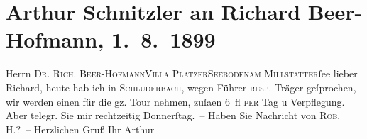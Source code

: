 

         
         \renewcommand{\erwaehntePersonen}{Personen: Richard Beer-Hofmann, Robert Hirschfeld}
         \renewcommand{\erwaehnteOrte}{Orte: Carbonin, Millstätter See, Seeboden, Toblach, Villa Platzer}
         \renewcommand{\erwaehnteWerke}{}
               \section[Arthur Schnitzler an Richard Beer-Hofmann, 1. 8. 1899]{ Arthur Schnitzler an Richard Beer-Hofmann, 1. 8. 1899}\nopagebreak{}\rehead{ }\begin{ledgroupsized}[t]{13cm}\normalsize\beginnumbering \toendnotes[C]{\smallbreak\pagebreak[2]} 
\pstart{}{\pb}Herrn \textsc{Dr. Rich.
                     Beer-Hofmann}\pend{}\pstart{}\textsc{Villa Platzer}\pend{}\pstart{}\textsc{Seeboden}\pend{}\pstart{}\textsc{am Millstätter}ſee\pend{}{\bigskip}\pstart
           \noindent{}{\pb}lieber Richard, heute hab ich in \textsc{Schluderbac\textcolor{gray}{h}}, wegen Führer \textsc{resp.} Träger geſprochen, wir werden
               einen für die gz. Tour nehmen, zuſa{\geminationm}en 6 fl \textsc{per} Tag u Verpflegung. Aber telegr. Sie mir rechtzeitig
               Donnerſtag. – Haben Sie Nachricht von \textsc{Rob. H.}? –\pend
           \pstart Herzlichen Gruß Ihr \spacefill\mbox{Arthur}\pend{}
         
         \endnumbering{}\end{ledgroupsized}  \newcommand{\dateiname}{L00956}\newcommand{\titel}{Arthur Schnitzler an Richard Beer-Hofmann, 1. 8. 1899}\newcommand{\editorInnen}{Martin Anton Müller und Gerd-Hermann Susen}
      